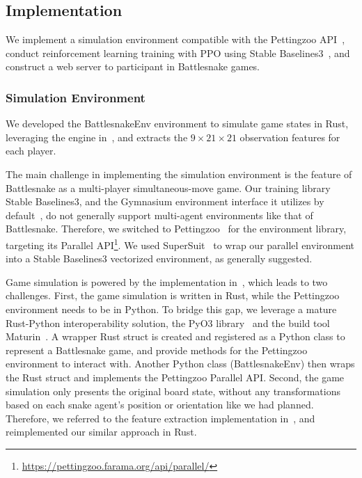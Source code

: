 \documentclass[conference]{IEEEtran}
\begin{document}
\subsection{Implementation}

We implement a simulation environment compatible with the Pettingzoo
API~\cite{terry2021pettingzoo},
conduct reinforcement learning training with PPO using Stable
Baselines3~\cite{raffin2024stable},
and construct a web server to participant in Battlesnake games.

\subsubsection{Simulation Environment}

We developed the \textsf{BattlesnakeEnv} environment to simulate game states in Rust, leveraging the engine in~\cite{wrenger2024rusty},
and extracts the $9\times 21\times 21$ observation features for each player.

The main challenge in implementing the simulation environment is the feature of
Battlesnake as a multi-player simultaneous-move game.
Our training library Stable Baselines3,
and the Gymnasium environment interface it utilizes by
default~\cite{farama2024gymnasium},
do not generally support multi-agent environments like that of Battlesnake.
Therefore, we switched to Pettingzoo~\cite{terry2021pettingzoo}
for the environment library,
targeting its Parallel
API\footnote{\url{https://pettingzoo.farama.org/api/parallel/}}.
We used SuperSuit~\cite{SuperSuit}
to wrap our parallel environment into a Stable Baselines3 vectorized
environment, as generally suggested.

Game simulation is powered by the implementation in~\cite{wrenger2024rusty},
which leads to two challenges. First, the game simulation is written in Rust,
while the Pettingzoo environment needs to be in Python. To bridge this gap,
we leverage a mature Rust-Python interoperability solution,
the PyO3 library~\cite{pyo3} and the build tool Maturin~\cite{maturin}.
A wrapper Rust struct is created and registered as a Python class to represent a
Battlesnake game,
and provide methods for the Pettingzoo environment to interact with.
Another Python class (\textsf{BattlesnakeEnv})
then wraps the Rust struct and implements the Pettingzoo Parallel API. Second,
the game simulation only presents the original board state,
without any transformations based on each snake agent's position or orientation
like we had planned. Therefore,
we referred to the feature extraction implementation
in~\cite{siddiqui2020multiagent},
and reimplemented our similar approach in Rust.
\end{document}
